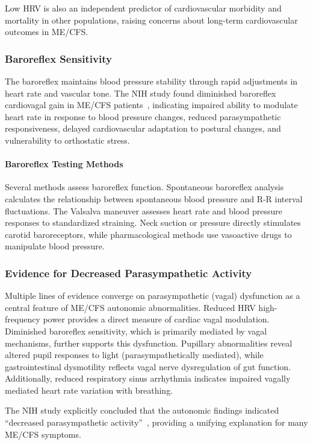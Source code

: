 Low HRV is also an independent predictor of cardiovascular morbidity and mortality in other populations, raising concerns about long-term cardiovascular outcomes in ME/CFS.

\subsubsection{Baroreflex Sensitivity}

The baroreflex maintains blood pressure stability through rapid adjustments in heart rate and vascular tone. The NIH study found diminished baroreflex cardiovagal gain in ME/CFS patients~\cite{walitt2024deep}, indicating impaired ability to modulate heart rate in response to blood pressure changes, reduced parasympathetic responsiveness, delayed cardiovascular adaptation to postural changes, and vulnerability to orthostatic stress.

\paragraph{Baroreflex Testing Methods}
Several methods assess baroreflex function. Spontaneous baroreflex analysis calculates the relationship between spontaneous blood pressure and R-R interval fluctuations. The Valsalva maneuver assesses heart rate and blood pressure responses to standardized straining. Neck suction or pressure directly stimulates carotid baroreceptors, while pharmacological methods use vasoactive drugs to manipulate blood pressure.

\subsubsection{Evidence for Decreased Parasympathetic Activity}

Multiple lines of evidence converge on parasympathetic (vagal) dysfunction as a central feature of ME/CFS autonomic abnormalities. Reduced HRV high-frequency power provides a direct measure of cardiac vagal modulation. Diminished baroreflex sensitivity, which is primarily mediated by vagal mechanisms, further supports this dysfunction. Pupillary abnormalities reveal altered pupil responses to light (parasympathetically mediated), while gastrointestinal dysmotility reflects vagal nerve dysregulation of gut function. Additionally, reduced respiratory sinus arrhythmia indicates impaired vagally mediated heart rate variation with breathing.

The NIH study explicitly concluded that the autonomic findings indicated ``decreased parasympathetic activity''~\cite{walitt2024deep}, providing a unifying explanation for many ME/CFS symptoms.

